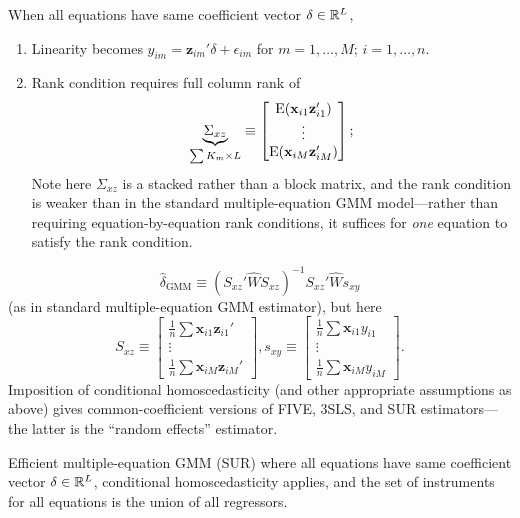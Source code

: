 \documentclass[8pt,letterpaper, landscape]{extarticle} %
\newcommand{\mx}{\ensuremath{\mathbf{x}}}
\begin{document}
\begin{multicols}{3}
\begin{description}
 When all equations have same coefficient vector $ \delta \in \mathbb{R}^L $,
\begin{enumerate}
\item Linearity becomes $ y_{im} = \mathbf{z}_{im}' \delta + \epsilon_{im} $ for $ m = 1, \dotsc , M $; $ i = 1, \dotsc , n $.
\item Rank condition requires full column rank of
\[ \underbrace{\Sigma_{xz}}_{\sum K_m \times L} \equiv \begin{bmatrix} \E (\mx_{i1} \mathbf{z}_{i1}') \\ \vdots \\ \E (\mx_{iM} \mathbf{z}_{iM}') \end{bmatrix}; \]
Note here $ \Sigma_{xz} $ is a stacked rather than a block matrix, and the rank condition is weaker than in the standard multiple-equation GMM model---rather than requiring equation-by-equation rank conditions, it suffices for \textit{one} equation to satisfy the rank condition.
\end{enumerate}
\[ \hat{\delta}_{\text{GMM}} \equiv (S_{xz}' \widehat{W} S_{xz})^{-1} S_{xz}' \widehat{W} s_{xy} \]
(as in standard multiple-equation GMM estimator), but here
\[
S_{xz} \equiv \begin{bmatrix}
\tfrac{1}{n} \sum \mx_{i1} \mathbf{z}_{i1}' \\
\vdots  \\
\tfrac{1}{n} \sum \mx_{iM} \mathbf{z}_{iM}'
\end{bmatrix},
s_{xy} \equiv \begin{bmatrix}
\tfrac{1}{n} \sum \mx_{i1} y_{i1} \\
\vdots \\
\tfrac{1}{n} \sum \mx_{iM} y_{iM}
\end{bmatrix}. \]
Imposition of conditional homoscedasticity (and other appropriate assumptions as above) gives common-coefficient versions of FIVE, 3SLS, and SUR estimators---the latter is the ``random effects'' estimator.

 Efficient multiple-equation GMM (SUR) where all equations have same coefficient vector $ \delta \in \mathbb{R}^L $, conditional homoscedasticity applies, and the set of instruments for all equations is the union of all regressors.


\end{description}
\end{multicols}
\end{document}
